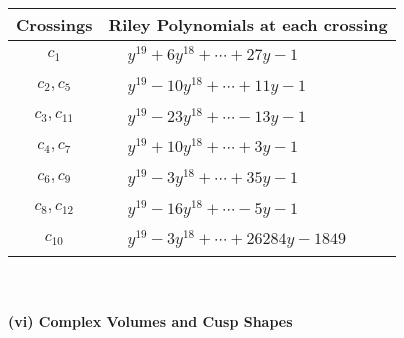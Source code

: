 \documentclass[1p]{elsarticle_modified}
\theoremstyle{definition}
\begin{document}
\begin{tabular}{m{50pt}|m{274pt}}
Crossings & \hspace{64pt}Riley Polynomials at each crossing \\
\hline $$\begin{aligned}c_{1}\end{aligned}$$&$\begin{aligned}
&y^{19}+6 y^{18}+\cdots+27 y-1
\end{aligned}$\\
\hline $$\begin{aligned}c_{2},c_{5}\end{aligned}$$&$\begin{aligned}
&y^{19}-10 y^{18}+\cdots+11 y-1
\end{aligned}$\\
\hline $$\begin{aligned}c_{3},c_{11}\end{aligned}$$&$\begin{aligned}
&y^{19}-23 y^{18}+\cdots-13 y-1
\end{aligned}$\\
\hline $$\begin{aligned}c_{4},c_{7}\end{aligned}$$&$\begin{aligned}
&y^{19}+10 y^{18}+\cdots+3 y-1
\end{aligned}$\\
\hline $$\begin{aligned}c_{6},c_{9}\end{aligned}$$&$\begin{aligned}
&y^{19}-3 y^{18}+\cdots+35 y-1
\end{aligned}$\\
\hline $$\begin{aligned}c_{8},c_{12}\end{aligned}$$&$\begin{aligned}
&y^{19}-16 y^{18}+\cdots-5 y-1
\end{aligned}$\\
\hline $$\begin{aligned}c_{10}\end{aligned}$$&$\begin{aligned}
&y^{19}-3 y^{18}+\cdots+26284 y-1849
\end{aligned}$\\
\hline
\end{tabular}\\~\\
\newpage\flushleft \textbf{(vi) Complex Volumes and Cusp Shapes}
\end{document}
